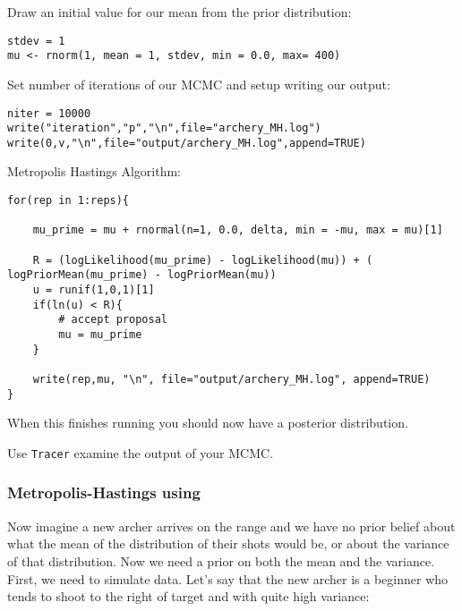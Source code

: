Draw an initial value for our mean from the prior distribution:

{\tt \begin{snugshade*}
 \begin{lstlisting}
stdev = 1
mu <- rnorm(1, mean = 1, stdev, min = 0.0, max= 400)
\end{lstlisting}
\end{snugshade*}}

Set number of iterations of our MCMC and setup writing our output:

{\tt \begin{snugshade*}
 \begin{lstlisting}
niter = 10000
write("iteration","p","\n",file="archery_MH.log")
write(0,v,"\n",file="output/archery_MH.log",append=TRUE)
\end{lstlisting}
\end{snugshade*}}


Metropolis Hastings Algorithm:

{\tt \begin{snugshade*}
 \begin{lstlisting}
for(rep in 1:reps){

	mu_prime = mu + rnormal(n=1, 0.0, delta, min = -mu, max = mu)[1] 

	R = (logLikelihood(mu_prime) - logLikelihood(mu)) + ( logPriorMean(mu_prime) - logPriorMean(mu)) 
	u = runif(1,0,1)[1] 
	if(ln(u) < R){
		# accept proposal
		mu = mu_prime 
	} 

	write(rep,mu, "\n", file="output/archery_MH.log", append=TRUE) 
} 
\end{lstlisting}
\end{snugshade*}}

When this finishes running you should now have a posterior distribution.

{\begin{framed}

Use {\tt Tracer} examine the output of your MCMC. 

\end{framed}}



\subsubsection{Metropolis-Hastings using \RevBayes}

Now imagine a new archer arrives on the range and we have no prior belief about what the mean of the distribution of their shots would be, or about the variance of that distribution. Now we need a prior on both the mean and the variance. First, we need to simulate data. Let's say that the new archer is a beginner who tends to shoot to the right of target and with quite high variance:

